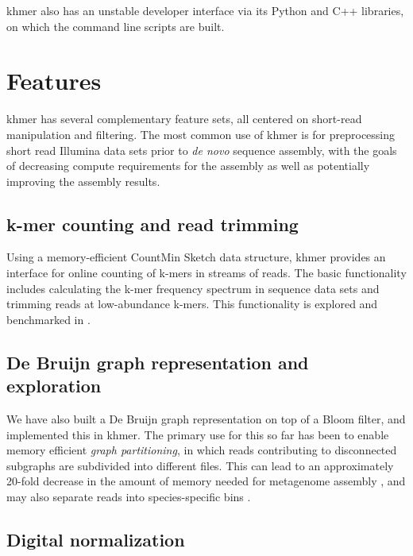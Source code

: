 \documentclass[10pt,a4paper,twocolumn]{article}
\begin{document}
khmer also has an unstable developer interface via its Python and C++ libraries, on which the command line scripts are built.

\section*{Features}

khmer has several complementary feature sets, all centered on short-read
manipulation and filtering.  The most common use of khmer is for preprocessing
short read Illumina data sets prior to {\em de novo} sequence assembly, with the
goals of decreasing compute requirements for the assembly as well as potentially
improving the assembly results.

\subsection*{k-mer counting and read trimming}

Using a memory-efficient CountMin Sketch data structure, khmer provides an
interface for online counting of k-mers in streams of reads.  The
basic functionality includes calculating the k-mer frequency spectrum
in sequence data sets and trimming reads at low-abundance k-mers.
This functionality is explored and benchmarked in \cite{Zhang2013}.

\subsection*{De Bruijn graph representation and exploration}

We have also built a De Bruijn graph representation on top of a Bloom
filter, and implemented this in khmer.  The primary use for this so
far has been to enable memory efficient {\em graph partitioning}, in
which reads contributing to disconnected subgraphs are subdivided into
different files.  This can lead to an approximately 20-fold decrease
in the amount of memory needed for metagenome assembly
\cite{Pell2012}, and may also separate reads into species-specific
bins \cite{Howe2014}.

\subsection*{Digital normalization}
\end{document}
